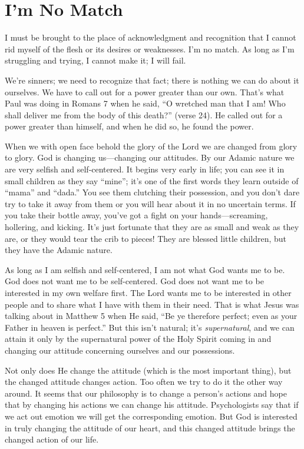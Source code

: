 \section*{I'm No Match}

I must be brought to the place of acknowledgment and
recognition that I cannot rid myself of the flesh or its desires
or weaknesses. I’m no match. As long as I’m struggling and
trying, I cannot make it; I will fail.

We're sinners; we need to recognize that fact; there is
nothing we can do about it ourselves. We have to call out
for a power greater than our own. That’s what Paul was
doing in Romans 7 when he said, “O wretched man that
I am! Who shall deliver me from the body of this death?”
(verse 24). He called out for a power greater than himself,
and when he did so, he found the power.

When we with open face behold the glory of the Lord
we are changed from glory to glory. God is changing
us—changing our attitudes. By our Adamic nature we are
very selfish and self-centered. It begins very early in life;
you can see it in small children as they say “mine”; it’s one
of the first words they learn outside of “mama” and “dada.”
You see them clutching their possession, and you don’t dare
try to take it away from them or you will hear about it in no
uncertain terms. If you take their bottle away, you’ve got a
fight on your hands—screaming, hollering, and kicking. It’s
just fortunate that they are as small and weak as they are,
or they would tear the crib to pieces! They are blessed little
children, but they have the Adamic nature.

As long as I am selfish and self-centered, I am not what
God wants me to be. God does not want me to be self-centered.
God does not want me to be interested in my own
welfare first. The Lord wants me to be interested in other
people and to share what I have with them in their need.
That is what Jesus was talking about in Matthew 5 when He
said, “Be ye therefore perfect; even as your Father in heaven
is perfect.” But this isn’t natural; it’s \emph{supernatural}, and we
can attain it only by the supernatural power of the Holy
Spirit coming in and changing our attitude concerning ourselves
and our possessions.

Not only does He change the attitude (which is the most
important thing), but the changed attitude changes action.
Too often we try to do it the other way around. It seems that
our philosophy is to change a person’s actions and hope
that by changing his actions we can change his attitude.
Psychologists say that if we act out emotion we will get
the corresponding emotion. But God is interested in truly
changing the attitude of our heart, and this changed attitude
brings the changed action of our life.


